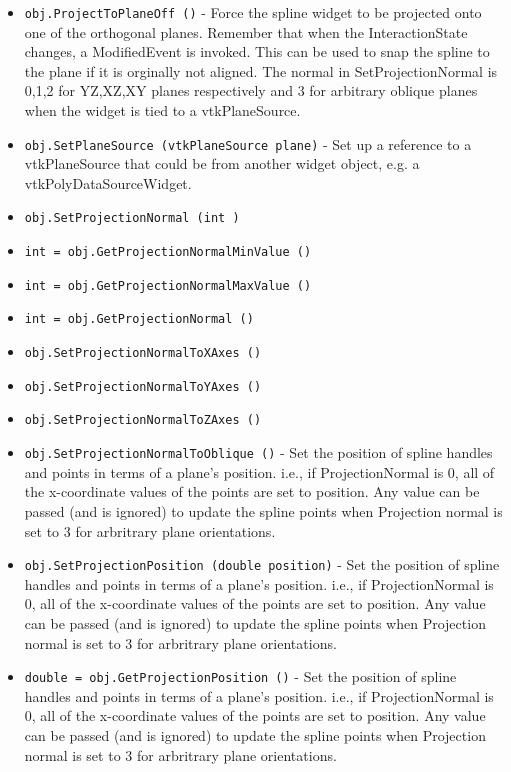 \begin{itemize}
\item  \verb|obj.ProjectToPlaneOff ()| -  Force the spline widget to be projected onto one of the orthogonal planes.
 Remember that when the InteractionState changes, a ModifiedEvent is invoked.
 This can be used to snap the spline to the plane if it is orginally
 not aligned.  The normal in SetProjectionNormal is 0,1,2 for YZ,XZ,XY
 planes respectively and 3 for arbitrary oblique planes when the widget
 is tied to a vtkPlaneSource.

\item  \verb|obj.SetPlaneSource (vtkPlaneSource plane)| -  Set up a reference to a vtkPlaneSource that could be from another widget
 object, e.g. a vtkPolyDataSourceWidget.

\item  \verb|obj.SetProjectionNormal (int )|

\item  \verb|int = obj.GetProjectionNormalMinValue ()|

\item  \verb|int = obj.GetProjectionNormalMaxValue ()|

\item  \verb|int = obj.GetProjectionNormal ()|

\item  \verb|obj.SetProjectionNormalToXAxes ()|

\item  \verb|obj.SetProjectionNormalToYAxes ()|

\item  \verb|obj.SetProjectionNormalToZAxes ()|

\item  \verb|obj.SetProjectionNormalToOblique ()| -  Set the position of spline handles and points in terms of a plane's
 position. i.e., if ProjectionNormal is 0, all of the x-coordinate
 values of the points are set to position. Any value can be passed (and is
 ignored) to update the spline points when Projection normal is set to 3
 for arbritrary plane orientations.

\item  \verb|obj.SetProjectionPosition (double position)| -  Set the position of spline handles and points in terms of a plane's
 position. i.e., if ProjectionNormal is 0, all of the x-coordinate
 values of the points are set to position. Any value can be passed (and is
 ignored) to update the spline points when Projection normal is set to 3
 for arbritrary plane orientations.

\item  \verb|double = obj.GetProjectionPosition ()| -  Set the position of spline handles and points in terms of a plane's
 position. i.e., if ProjectionNormal is 0, all of the x-coordinate
 values of the points are set to position. Any value can be passed (and is
 ignored) to update the spline points when Projection normal is set to 3
 for arbritrary plane orientations.


\end{itemize}
